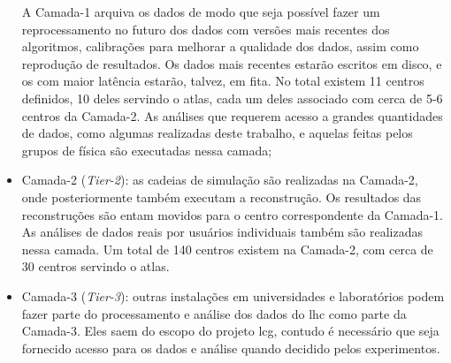 \begin{itemize}
A Camada-1 arquiva os dados de modo que seja possível fazer um reprocessamento 
no futuro dos dados com versões mais recentes dos algoritmos, calibrações 
para melhorar a qualidade dos dados, assim como reprodução de resultados.
Os dados mais recentes estarão escritos em disco, e os com
maior latência estarão, talvez, em fita. No total existem 11 centros definidos,
10 deles servindo o \gls{atlas}, cada um deles associado com cerca de 5-6
centros da Camada-2.
As análises que requerem acesso a grandes quantidades de dados, como algumas
realizadas deste trabalho, e aquelas feitas pelos grupos de física são executadas 
nessa camada;
\item Camada-2 (\emph{Tier-2}): as cadeias de simulação são realizadas na Camada-2, onde
posteriormente também executam a reconstrução. Os resultados das reconstruções
são entam movidos para o centro correspondente da Camada-1. 
As análises de dados reais por usuários individuais também são realizadas nessa
camada. Um total de 140 centros existem na Camada-2, com cerca de 30 centros
servindo o \gls{atlas}.
\item Camada-3 (\emph{Tier-3}): outras instalações em universidades e
laboratórios podem fazer parte do processamento e análise dos dados do
\gls{lhc} como parte da Camada-3. Eles saem do escopo do projeto \gls{lcg}, contudo é
necessário que seja fornecido acesso para os dados e análise quando decidido
pelos experimentos.
\end{itemize}




